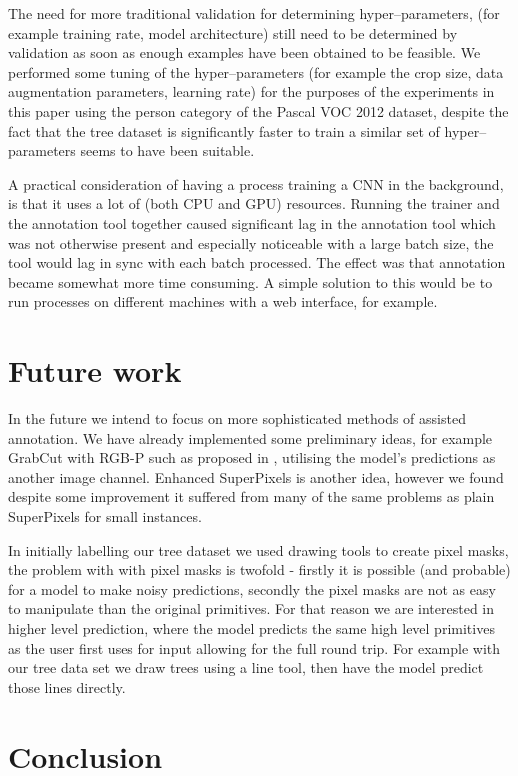 The need for more traditional validation for determining hyper--parameters, (for example training rate, model architecture) still need to be determined by validation as soon as enough examples have been obtained to be feasible. We performed some tuning of the hyper--parameters (for example the crop size, data augmentation parameters, learning rate) for the purposes of the experiments in this paper using the person category of the Pascal \gls{VOC} 2012 dataset, despite the fact that the tree dataset is significantly faster to train a similar set of hyper--parameters seems to have been suitable.


A practical consideration of having a process training a \gls{CNN} in the background, is that it uses a lot of (both \gls{CPU} and \gls{GPU}) resources. Running the trainer and the annotation tool together caused significant lag in the annotation tool which was not otherwise present and especially noticeable with a large batch size, the tool would lag in sync with each batch processed. The effect was that annotation became somewhat more time consuming. A simple solution to this would be to run processes on different machines with a web interface, for example.


\section{Future work}


In the future we intend to focus on more sophisticated methods of assisted annotation. We have already implemented some preliminary ideas, for example GrabCut with RGB-P such as proposed in \cite{Xu2016a}, utilising the model's predictions as another image channel.  Enhanced SuperPixels is another idea, however we found despite some improvement it suffered from many of the same problems as plain SuperPixels for small instances. 

In initially labelling our tree dataset we used drawing tools to create pixel masks, the problem with with pixel masks is twofold - firstly it is possible (and probable) for a model to make noisy predictions, secondly the pixel masks are not as easy to manipulate than the original primitives. For that reason we are interested in higher level prediction, where the model predicts the same high level primitives as the user first uses for input allowing for the full round trip. For example with our tree data set we draw trees using a line tool, then have the model predict those lines directly.


\section {Conclusion}

